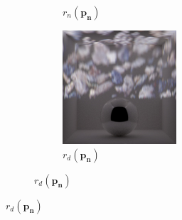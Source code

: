 \begin{figure}[]
\begin{subfigure}{\textwidth}
\begin{subfigure}{0.32\textwidth}
            \caption*{\(r_n(\bm{p_n})\)}
        \end{subfigure}
        \hfill
        \begin{subfigure}{0.32\textwidth}
            \centering
            \includegraphics[width=\textwidth]{images/04-experiment03/dof/normal_on_dof.jpg}
            \caption*{\(r_d(\bm{p_n})\)}
        \end{subfigure}
        

\end{subfigure}
\end{figure}
